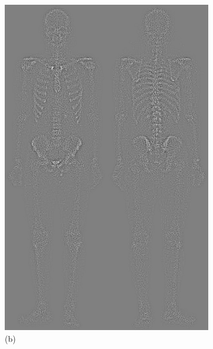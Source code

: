 \begin{figure}[h!]
\begin{subfigure}[b]{0.4\linewidth}
    	\includegraphics[width=\linewidth]{myfigure/p2/2-b.png}
		\caption*{(b)}
		\label{fig:2b}
  	\end{subfigure}
  	\begin{subfigure}[b]{0.4\linewidth}

\end{subfigure}
\end{figure}
